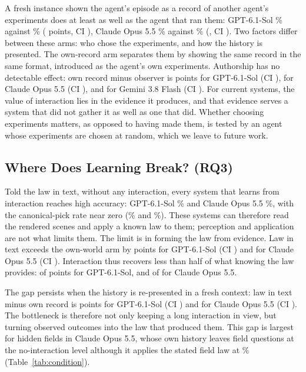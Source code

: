 A fresh instance shown the agent's episode as a record of another agent's experiments does at least as well as the agent that ran them: GPT-6.1-Sol \% against \% ( points, CI ), Claude Opus 5.5 \% against \% (, CI ). Two factors differ between these arms: who chose the experiments, and how the history is presented. The own-record arm separates them by showing the same record in the same format, introduced as the agent's own experiments. Authorship has no detectable effect: own record minus observer is  points for GPT-6.1-Sol (CI ),  for Claude Opus 5.5 (CI ), and  for Gemini 3.8 Flash (CI ). For current systems, the value of interaction lies in the evidence it produces, and that evidence serves a system that did not gather it as well as one that did. Whether choosing experiments matters, as opposed to having made them, is tested by an agent whose experiments are chosen at random, which we leave to future work.

\subsection{Where Does Learning Break? (RQ3)}

Told the law in text, without any interaction, every system that learns from interaction reaches high accuracy: GPT-6.1-Sol \% and Claude Opus 5.5 \%, with the canonical-pick rate near zero (\% and \%). These systems can therefore read the rendered scenes and apply a known law to them; perception and application are not what limits them. The limit is in forming the law from evidence. Law in text exceeds the own-world arm by  points for GPT-6.1-Sol (CI ) and  for Claude Opus 5.5 (CI ). Interaction thus recovers less than half of what knowing the law provides:  of  points for GPT-6.1-Sol, and  of  for Claude Opus 5.5.

The gap persists when the history is re-presented in a fresh context: law in text minus own record is  points for GPT-6.1-Sol (CI ) and  for Claude Opus 5.5 (CI ). The bottleneck is therefore not only keeping a long interaction in view, but turning observed outcomes into the law that produced them. This gap is largest for hidden fields in Claude Opus 5.5, whose own history leaves field questions at the no-interaction level although it applies the stated field law at \% (Table~\ref{tab:condition}).

